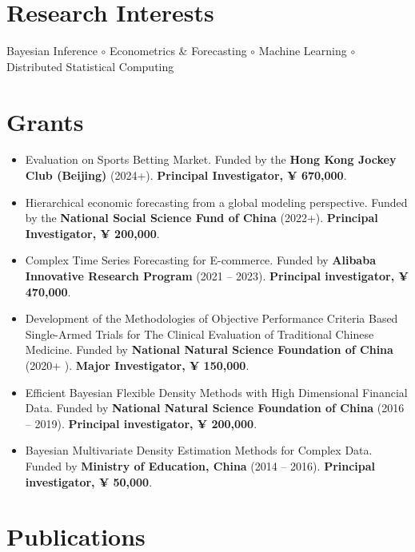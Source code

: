 \documentclass[twoside,a4paper]{article}
\begin{document}
\section{Research Interests}

Bayesian Inference $\circ$ Econometrics \& Forecasting $\circ$ Machine Learning $\circ$ Distributed Statistical Computing


\section{Grants}
\begin{itemize}

\item Evaluation on Sports Betting Market. Funded by the \textbf{Hong Kong Jockey Club (Beijing)} (2024+). \textbf{Principal Investigator, ¥ 670,000}.

\item Hierarchical economic forecasting from a global modeling perspective. Funded by the \textbf{National Social Science Fund of China} (2022+). \textbf{Principal Investigator, ¥ 200,000}.

\item Complex Time Series Forecasting for E-commerce. Funded by \textbf{Alibaba Innovative Research Program} (2021 -- 2023). \textbf{Principal investigator, ¥ 470,000}.

\item Development of the Methodologies of Objective Performance Criteria Based Single-Armed Trials for The Clinical Evaluation of Traditional Chinese Medicine. Funded by \textbf{National Natural Science Foundation of China} (2020+  ). \textbf{Major Investigator, ¥ 150,000}.

\item Efficient Bayesian Flexible Density Methods with High Dimensional Financial Data. Funded by \textbf{National Natural Science Foundation of China} (2016 -- 2019). \textbf{Principal investigator, ¥ 200,000}.

\item Bayesian Multivariate Density Estimation Methods for Complex Data. Funded by \textbf{Ministry of Education, China} (2014 -- 2016). \textbf{Principal investigator, ¥ 50,000}.

\end{itemize}

\section{Publications}
\end{document}

